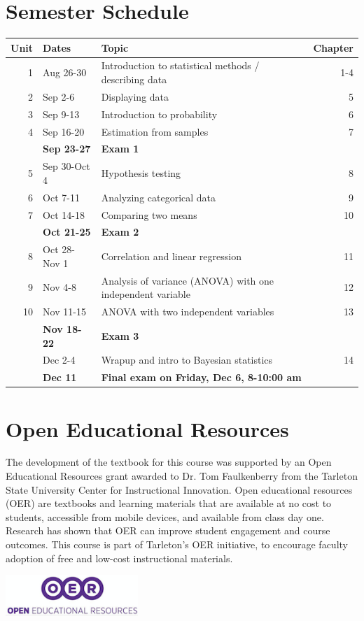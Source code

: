 \documentclass[10pt]{article}
\begin{document}
\section*{Semester Schedule}
\label{sec:orgd40632e}
\begin{center}
\begin{tabular}{rllr}
Unit & Dates & Topic & Chapter\\
\hline
1 & Aug 26-30 & Introduction to statistical methods / describing data & 1-4\\
2 & Sep 2-6 & Displaying data & 5\\
3 & Sep 9-13 & Introduction to probability & 6\\
4 & Sep 16-20 & Estimation from samples & 7\\
 & \textbf{Sep 23-27} & \textbf{Exam 1} & \\
5 & Sep 30-Oct 4 & Hypothesis testing & 8\\
6 & Oct 7-11 & Analyzing categorical data & 9\\
7 & Oct 14-18 & Comparing two means & 10\\
 & \textbf{Oct 21-25} & \textbf{Exam 2} & \\
8 & Oct 28-Nov 1 & Correlation and linear regression & 11\\
9 & Nov 4-8 & Analysis of variance (ANOVA) with one independent variable & 12\\
10 & Nov 11-15 & ANOVA with two independent variables & 13\\
 & \textbf{Nov 18-22} & \textbf{Exam 3} & \\
 & Dec 2-4 & Wrapup and intro to Bayesian statistics & 14\\
 & \textbf{Dec 11} & \textbf{Final exam on Friday, Dec 6, 8-10:00 am} & \\
\end{tabular}
\end{center}

\section*{Open Educational Resources}
\label{sec:org3bca421}
The development of the textbook for this course was supported by an Open Educational Resources grant awarded to Dr. Tom Faulkenberry from the Tarleton State University Center for Instructional Innovation. Open educational resources (OER) are textbooks and learning materials that are available at no cost to students, accessible from mobile devices, and available from class day one. Research has shown that OER can improve student engagement and course outcomes. This course is part of Tarleton’s OER initiative, to encourage faculty adoption of free and low-cost instructional materials.


\begin{center}
\includegraphics[width=5cm]{oerLogo.png}
\end{center}
\end{document}
